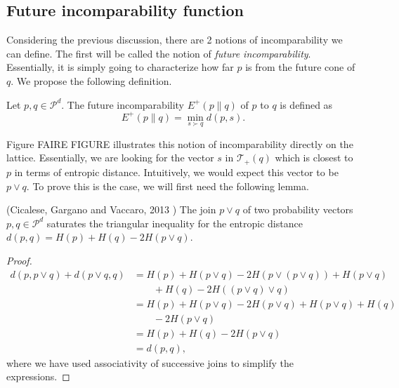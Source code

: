 \subsection{Future incomparability function}

Considering the previous discussion, there are 2 notions of incomparability we can define. The first will be called the notion of \textit{future incomparability}. Essentially, it is simply going to characterize how far $p$ is from the future cone of $q$. We propose the following definition.

\begin{definition} \label{def:future_incomparability_monotone}
    Let $p, q \in \mathcal{P}^d$. The future incomparability $E^+(p \parallel q)$ of $p$ to $q$ is defined as
    \begin{equation}
        E^+ (p \parallel q) = \min_{s \succ q} d(p, s).
    \end{equation}
\end{definition}

Figure FAIRE FIGURE illustrates this notion of incomparability directly on the lattice. Essentially, we are looking for the vector $s$ in $\mathcal{T}_+(q)$ which is closest to $p$ in terms of entropic distance. Intuitively, we would expect this vector to be $p \vee q$. To prove this is the case, we will first need the following lemma.

\begin{lemma} (Cicalese, Gargano and Vaccaro, 2013 \cite{cicalese_information_2013}) \label{lem:comp_future} 
    The join $p \vee q$ of two probability vectors $p, q \in \mathcal{P}^d$ saturates the triangular inequality for the entropic distance $d(p, q) = H(p) + H(q) - 2H(p \vee q)$.
\end{lemma}

\begin{proof}
    \begin{align}
        d(p, p \vee q) + d(p \vee q, q) &= H(p) + H(p \vee q) - 2H(p \vee (p \vee q)) + H(p \vee q) \nonumber \\
        &\quad \quad + H(q) - 2H((p \vee q) \vee q) \\
        &= H(p) + H(p \vee q) - 2H(p \vee q) + H(p \vee q) + H(q) \nonumber\\
        &\quad \quad - 2H(p \vee q) \\
        &= H(p) + H(q) - 2H(p \vee q) \\
        &= d(p, q),
    \end{align}
    where we have used associativity of successive joins to simplify the expressions. \phantom{\qedhere}
\end{proof}

